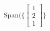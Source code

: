 \documentclass[preview]{standalone}
\begin{document}
\begin{align*}
\text{Span}\big(\big\{\begin{bmatrix} 1 \\ 2 \\ 1 \end{bmatrix}\big\}
\end{align*}
\end{document}
